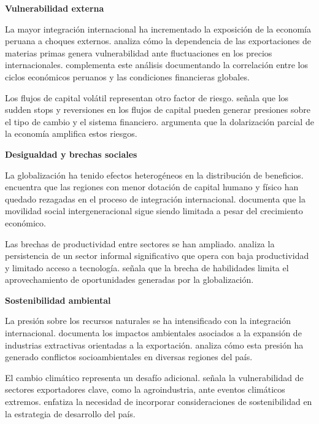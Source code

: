 \documentclass[12pt, a4paper]{article}
\begin{document}
\textbf{Vulnerabilidad externa}  

La mayor integración internacional ha incrementado la exposición de la economía peruana a choques externos. \textcite{mendoza2021volatilidad} analiza cómo la dependencia de las exportaciones de materias primas genera vulnerabilidad ante fluctuaciones en los precios internacionales. \textcite{jimenez2020ciclos} complementa este análisis documentando la correlación entre los ciclos económicos peruanos y las condiciones financieras globales.

Los flujos de capital volátil representan otro factor de riesgo. \textcite{rossini2019politica} señala que los sudden stops y reversiones en los flujos de capital pueden generar presiones sobre el tipo de cambio y el sistema financiero. \textcite{cruz2021financiera} argumenta que la dolarización parcial de la economía amplifica estos riesgos.

\textbf{Desigualdad y brechas sociales}  

La globalización ha tenido efectos heterogéneos en la distribución de beneficios. \textcite{herrera2020brechas} encuentra que las regiones con menor dotación de capital humano y físico han quedado rezagadas en el proceso de integración internacional. \textcite{yamada2021movilidad} documenta que la movilidad social intergeneracional sigue siendo limitada a pesar del crecimiento económico.

Las brechas de productividad entre sectores se han ampliado. \textcite{chacaltana2019dualidad} analiza la persistencia de un sector informal significativo que opera con baja productividad y limitado acceso a tecnología. \textcite{lavado2020skills} señala que la brecha de habilidades limita el aprovechamiento de oportunidades generadas por la globalización.

\textbf{Sostenibilidad ambiental}  

La presión sobre los recursos naturales se ha intensificado con la integración internacional. \textcite{glave2021extractivas} documenta los impactos ambientales asociados a la expansión de industrias extractivas orientadas a la exportación. \textcite{pulgar2019conflictos} analiza cómo esta presión ha generado conflictos socioambientales en diversas regiones del país.

El cambio climático representa un desafío adicional. \textcite{vargas2020clima} señala la vulnerabilidad de sectores exportadores clave, como la agroindustria, ante eventos climáticos extremos. \textcite{sanchez2021adaptacion} enfatiza la necesidad de incorporar consideraciones de sostenibilidad en la estrategia de desarrollo del país.
\end{document}

